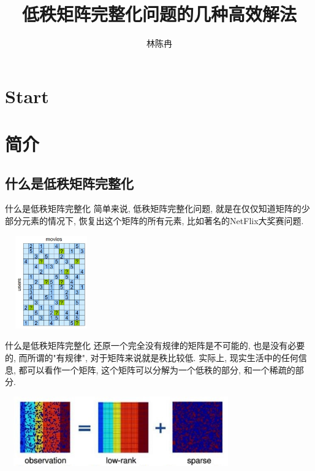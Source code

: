 \documentclass[slidestop, compress, mathserif, UTF8]{beamer}
\title{低秩矩阵完整化问题的几种高效解法}
\author{林陈冉}
\institute{中国科学院大学}
\numberwithin{equation}{section}                                        %
\begin{document}
	\section*{Start}                            %
		\begin{frame}
			\titlepage
		\end{frame}
	\setcounter{section}{0}                     %
	\section{简介}\label{section1}
		\subsection{什么是低秩矩阵完整化}
			\begin{frame}[t]{什么是低秩矩阵完整化}
				简单来说, 低秩矩阵完整化问题, 就是在仅仅知道矩阵的少部分元素的情况下, 恢复出这个矩阵的所有元素, 比如著名的NetFlix大奖赛问题.

				\centering
					\includegraphics[width=4cm,height=4cm]{src//3.jpg}
			\end{frame}
			\begin{frame}[t]{什么是低秩矩阵完整化}
				还原一个完全没有规律的矩阵是不可能的, 也是没有必要的, 而所谓的"有规律", 对于矩阵来说就是秩比较低. 实际上, 现实生活中的任何信息, 都可以看作一个矩阵, 这个矩阵可以分解为一个低秩的部分, 和一个稀疏的部分.

				\centering
					\includegraphics[width=10cm,height=3cm]{src//5.jpg}
			\end{frame}
\end{document}
